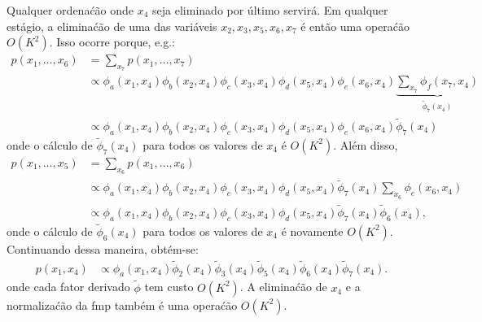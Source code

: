 \begin{exenumerate}
\begin{solution}
        Qualquer ordena\'c\~ao onde $x_4$ seja eliminado por \'ultimo servir\'a. Em qualquer est\'agio, a elimina\'c\~ao de uma das vari\'aveis $x_2, x_3, x_5, x_6, x_7$ \'e ent\~ao uma opera\'c\~ao $O(K^2)$. Isso ocorre porque, e.g.:
        \begin{align}
            p(x_1, \ldots, x_6) & = \sum_{x_7} p(x_1, \ldots, x_7)\\
            & \propto \phi_a(x_1,x_4)\phi_b(x_2,x_4)\phi_c(x_3,x_4)\phi_d(x_5,x_4)\phi_e(x_6,x_4) \underbrace{\sum_{x_7} \phi_f(x_7,x_4)}_{\tilde{\phi}_7(x_4)}\\
            & \propto \phi_a(x_1,x_4)\phi_b(x_2,x_4)\phi_c(x_3,x_4)\phi_d(x_5,x_4)\phi_e(x_6,x_4) \tilde{\phi}_7(x_4)
        \end{align}
        onde o c\'alculo de $\tilde{\phi}_7(x_4)$ para todos os valores de $x_4$ \'e $O(K^2)$. Al\'em disso,
        \begin{align}
            p(x_1, \ldots, x_5) & = \sum_{x_6} p(x_1, \ldots, x_6)\\
            & \propto \phi_a(x_1,x_4)\phi_b(x_2,x_4)\phi_c(x_3,x_4)\phi_d(x_5,x_4) \tilde{\phi}_7(x_4) \sum_{x_6}\phi_e(x_6,x_4)\\
            & \propto \phi_a(x_1,x_4)\phi_b(x_2,x_4)\phi_c(x_3,x_4)\phi_d(x_5,x_4) \tilde{\phi}_7(x_4) \tilde{\phi}_6(x_4), 
        \end{align}
        onde o c\'alculo de $\tilde{\phi}_6(x_4)$ para todos os valores de $x_4$ \'e novamente $O(K^2)$. Continuando dessa maneira, obt\'em-se:
        \begin{align}
            p(x_1, x_4) &\propto \phi_a(x_1,x_4) \tilde{\phi}_2(x_4)\tilde{\phi}_3(x_4)\tilde{\phi}_5(x_4)\tilde{\phi}_6(x_4)\tilde{\phi}_7(x_4).
        \end{align}
        onde cada fator derivado $\tilde{\phi}$ tem custo $O(K^2)$. A elimina\'c\~ao de $x_4$ e a normaliza\'c\~ao da fmp tamb\'em \'e uma opera\'c\~ao $O(K^2)$.
    \end{solution}
    
\end{exenumerate}